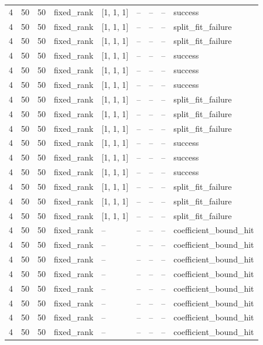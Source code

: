 \begin{longtable}{lllllllll}
4 & 50 & 50 & fixed\_rank & [1, 1, 1] & -- & -- & -- & success \\
4 & 50 & 50 & fixed\_rank & [1, 1, 1] & -- & -- & -- & split\_fit\_failure \\
4 & 50 & 50 & fixed\_rank & [1, 1, 1] & -- & -- & -- & split\_fit\_failure \\
4 & 50 & 50 & fixed\_rank & [1, 1, 1] & -- & -- & -- & success \\
4 & 50 & 50 & fixed\_rank & [1, 1, 1] & -- & -- & -- & success \\
4 & 50 & 50 & fixed\_rank & [1, 1, 1] & -- & -- & -- & success \\
4 & 50 & 50 & fixed\_rank & [1, 1, 1] & -- & -- & -- & split\_fit\_failure \\
4 & 50 & 50 & fixed\_rank & [1, 1, 1] & -- & -- & -- & split\_fit\_failure \\
4 & 50 & 50 & fixed\_rank & [1, 1, 1] & -- & -- & -- & split\_fit\_failure \\
4 & 50 & 50 & fixed\_rank & [1, 1, 1] & -- & -- & -- & success \\
4 & 50 & 50 & fixed\_rank & [1, 1, 1] & -- & -- & -- & success \\
4 & 50 & 50 & fixed\_rank & [1, 1, 1] & -- & -- & -- & success \\
4 & 50 & 50 & fixed\_rank & [1, 1, 1] & -- & -- & -- & split\_fit\_failure \\
4 & 50 & 50 & fixed\_rank & [1, 1, 1] & -- & -- & -- & split\_fit\_failure \\
4 & 50 & 50 & fixed\_rank & [1, 1, 1] & -- & -- & -- & split\_fit\_failure \\
4 & 50 & 50 & fixed\_rank & -- & -- & -- & -- & coefficient\_bound\_hit \\
4 & 50 & 50 & fixed\_rank & -- & -- & -- & -- & coefficient\_bound\_hit \\
4 & 50 & 50 & fixed\_rank & -- & -- & -- & -- & coefficient\_bound\_hit \\
4 & 50 & 50 & fixed\_rank & -- & -- & -- & -- & coefficient\_bound\_hit \\
4 & 50 & 50 & fixed\_rank & -- & -- & -- & -- & coefficient\_bound\_hit \\
4 & 50 & 50 & fixed\_rank & -- & -- & -- & -- & coefficient\_bound\_hit \\
4 & 50 & 50 & fixed\_rank & -- & -- & -- & -- & coefficient\_bound\_hit \\
4 & 50 & 50 & fixed\_rank & -- & -- & -- & -- & coefficient\_bound\_hit \\

\end{longtable}
